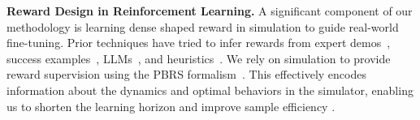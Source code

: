 \noindent\textbf{Reward Design in Reinforcement Learning.} 
A significant component of our methodology is learning dense shaped reward in simulation to guide real-world fine-tuning. Prior techniques have tried to infer rewards from expert demos~\citep{ziebart2008maxentirl, ho2016generative}, success examples~\citep{fu2018variational,li2021mural}, LLMs~\citep{ma2023eureka, yu2023language}, and heuristics~\citep{margolisrapid, dota2}. We rely on simulation to provide reward supervision \cite{westenbroek2022lyapunov} using the PBRS formalism~\citep{ng1999policy}. This effectively encodes information about the dynamics and optimal behaviors in the simulator, enabling us to shorten the learning horizon and improve sample efficiency \cite{cheng2021heuristic, westenbroek2022lyapunov}.